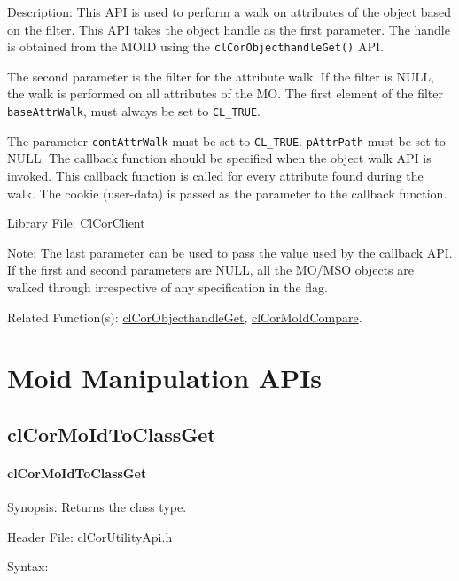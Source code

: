 \begin{flushleft}
\begin{Desc}
\end{Desc}

\begin{Desc}
\item[Description:] 
This API is used to perform a walk on attributes of the object based on the filter. This API takes the 
object handle as the first parameter. The handle is obtained from the MOID using the {\tt{clCorObjecthandleGet()}} API. 
\par
The second parameter is the filter for the attribute walk. If the filter is NULL, the walk is performed on all attributes of the MO. The first element of
the filter {\tt{baseAttrWalk}}, must always be set to {\tt{CL\_\-TRUE}}. 
\par 
The parameter {\tt{contAttrWalk}} must be set to {\tt{CL\_\-TRUE}}. {\tt{pAttrPath}} must be set to NULL. The callback function should be specified when 
the object walk API is invoked. This callback function is called for every attribute found during the walk. The cookie (user-data) is passed as the 
parameter to the callback 
function.

\end{Desc}
\begin{Desc}
\item[Library File:]Cl\-Cor\-Client\end{Desc}
\begin{Desc}
\item[Note:]The last parameter can be used to pass the value used by the callback API. If the first and second parameters are NULL,
all the MO/MSO objects are walked through irrespective of any specification in the flag.\end{Desc}
\begin{Desc}
\item[Related Function(s):]\hyperlink{pagecor106}{clCorObjecthandleGet}, \hyperlink{pagecor128}{clCorMoIdCompare}. \end{Desc}
\newpage
   

\section{Moid Manipulation APIs}

\subsection{clCorMoIdToClassGet}
\hypertarget{pagecor120}{}\paragraph{cl\-Cor\-MoId\-To\-Class\-Get}\label{pagecor120}
\begin{Desc}
\item[Synopsis:]Returns the class type.\end{Desc}
\begin{Desc}
\item[Header File:]clCorUtilityApi.h\end{Desc}
\begin{Desc}
\item[Syntax:]


\end{Desc}
\end{flushleft}
